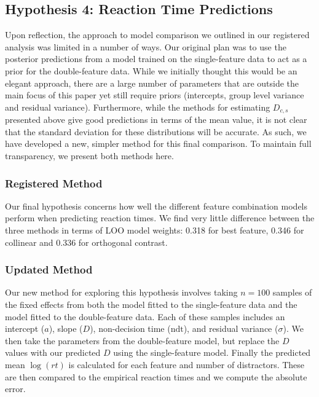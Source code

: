 \documentclass[preprint,12pt,authoryear]{elsarticle}
\begin{document}
\subsection{Hypothesis 4: Reaction Time Predictions}

Upon reflection, the approach to model comparison we outlined in our registered analysis was limited in a number of ways. Our original plan was to use the posterior predictions from a model trained on the single-feature data to act as a prior for the double-feature data. While we initially thought this would be an elegant approach, there are a large number of parameters that are outside the main focus of this paper yet still require priors (intercepts, group level variance and residual variance). Furthermore, while the methods for estimating $D_{c,s}$ presented above give good predictions in terms of the mean value, it is not clear that the standard deviation for these distributions will be accurate. As such, we have developed a new, simpler method for this final comparison. To maintain full transparency, we present both methods here. 

\subsubsection{Registered Method}

Our final hypothesis concerns how well the different feature combination models perform when predicting reaction times. We find very little difference between the three methods in terms of LOO model weights: 0.318 for best feature, 0.346 for collinear and 0.336 for orthogonal contrast. 

\subsubsection{Updated Method}

Our new method for exploring this hypothesis involves taking $n=100$ samples of the fixed effects from both the model fitted to the single-feature data and the model fitted to the double-feature data. Each of these samples includes an intercept ($a$), slope ($D$), non-decision time ($\text{ndt}$), and residual variance ($\sigma$). We then take the parameters from the double-feature model, but replace the $D$ values with our predicted $D$ using the single-feature model. Finally the predicted mean $\log(rt)$ is calculated for each feature and number of distractors. These are then compared to the empirical reaction times and we compute the absolute error.
\end{document}
